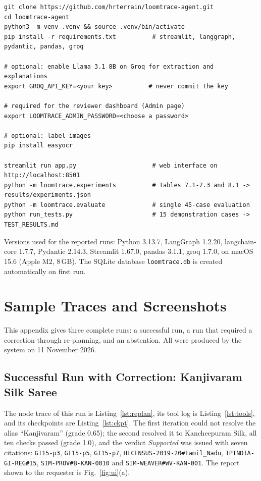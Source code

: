\begin{lstlisting}[language={},numbers=none]
git clone https://github.com/hrterrain/loomtrace-agent.git
cd loomtrace-agent
python3 -m venv .venv && source .venv/bin/activate
pip install -r requirements.txt          # streamlit, langgraph, pydantic, pandas, groq

# optional: enable Llama 3.1 8B on Groq for extraction and explanations
export GROQ_API_KEY=<your key>          # never commit the key

# required for the reviewer dashboard (Admin page)
export LOOMTRACE_ADMIN_PASSWORD=<choose a password>

# optional: label images
pip install easyocr

streamlit run app.py                     # web interface on http://localhost:8501
python -m loomtrace.experiments          # Tables 7.1-7.3 and 8.1 -> results/experiments.json
python -m loomtrace.evaluate             # single 45-case evaluation
python run_tests.py                      # 15 demonstration cases -> TEST_RESULTS.md
\end{lstlisting}

Versions used for the reported runs: Python 3.13.7, LangGraph 1.2.20, langchain-core 1.7.7,
Pydantic 2.14.3, Streamlit 1.67.0, pandas 3.1.1, groq 1.7.0, on macOS 15.6 (Apple M2, 8\,GB). The SQLite
database \texttt{loomtrace.db} is created automatically on first run.

\chapter{Sample Traces and Screenshots}

This appendix gives three complete runs: a successful run, a run that required a correction through
re-planning, and an abstention. All were produced by the system on 11 November 2026.

\section{Successful Run with Correction: Kanjivaram Silk Saree}

The node trace of this run is Listing~\ref{lst:replan}, its tool log is Listing~\ref{lst:tools}, and
its checkpoints are Listing~\ref{lst:ckpt}. The first iteration could not resolve the alias
``Kanjivaram'' (grade 0.65); the second resolved it to Kancheepuram Silk, all ten checks passed (grade
1.0), and the verdict \emph{Supported} was issued with seven citations: \texttt{GI15-p3},
\texttt{GI15-p5}, \texttt{GI15-p7}, \texttt{HLCENSUS-2019-20\#Tamil\_Nadu},
\texttt{IPINDIA-GI-REG\#15}, \texttt{SIM-PROV\#B-KAN-0010} and \texttt{SIM-WEAVER\#WV-KAN-001}. The
report shown to the requester is Fig.~\ref{fig:ui}(a).

